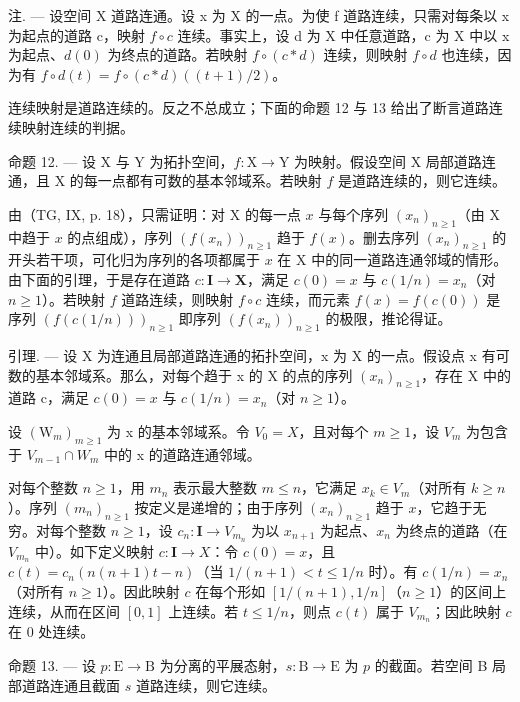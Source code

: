 注. --- 设空间 X 道路连通。设 x 为 X 的一点。为使 f 道路连续，只需对每条以 x 为起点的道路 c，映射 \(f \circ c\) 连续。事实上，设 d 为 X 中任意道路，c 为 X 中以 x 为起点、\(d(0)\) 为终点的道路。若映射 \(f \circ (c * d)\) 连续，则映射 \(f \circ d\) 也连续，因为有 \(f \circ d(t) = f \circ (c * d)((t + 1)/2)\)。

连续映射是道路连续的。反之不总成立；下面的命题 12 与 13 给出了断言道路连续映射连续的判据。

命题 12. --- 设 X 与 Y 为拓扑空间，\(f: \mathrm{X} \to \mathrm{Y}\) 为映射。假设空间 X 局部道路连通，且 X 的每一点都有可数的基本邻域系。若映射 \(f\) 是道路连续的，则它连续。

由（TG, IX, p. 18），只需证明：对 X 的每一点 \(x\) 与每个序列 \((x_n)_{n \geqslant 1}\)（由 X 中趋于 \(x\) 的点组成），序列 \((f(x_n))_{n \geqslant 1}\) 趋于 \(f(x)\)。删去序列 \((x_n)_{n \geqslant 1}\) 的开头若干项，可化归为序列的各项都属于 \(x\) 在 X 中的同一道路连通邻域的情形。由下面的引理，于是存在道路 \(c: \mathbf{I} \to \mathbf{X}\)，满足 \(c(0) = x\) 与 \(c(1/n) = x_n\)（对 \(n \geqslant 1\)）。若映射 \(f\) 道路连续，则映射 \(f \circ c\) 连续，而元素 \(f(x) = f(c(0))\) 是序列 \((f(c(1/n)))_{n \geqslant 1}\) 即序列 \((f(x_n))_{n \geqslant 1}\) 的极限，推论得证。

引理. --- 设 X 为连通且局部道路连通的拓扑空间，x 为 X 的一点。假设点 x 有可数的基本邻域系。那么，对每个趋于 x 的 X 的点的序列 \((x_{n})_{n\geqslant1}\)，存在 X 中的道路 c，满足 \(c(0)=x\) 与 \(c(1/n)=x_{n}\)（对 \(n\geqslant1\)）。

设 \((\mathrm{W}_{m})_{m\geqslant1}\) 为 x 的基本邻域系。令 \(V_{0}=X\)，且对每个 \(m\geqslant1\)，设 \(V_{m}\) 为包含于 \(V_{m-1}\cap W_{m}\) 中的 x 的道路连通邻域。

对每个整数 \(n \geqslant 1\)，用 \(m_n\) 表示最大整数 \(m \leqslant n\)，它满足 \(x_k \in V_m\)（对所有 \(k \geqslant n\)）。序列 \((m_n)_{n \geqslant 1}\) 按定义是递增的；由于序列 \((x_n)_{n \geqslant 1}\) 趋于 \(x\)，它趋于无穷。对每个整数 \(n \geqslant 1\)，设 \(c_n: \mathbf{I} \to V_{m_n}\) 为以 \(x_{n+1}\) 为起点、\(x_n\) 为终点的道路（在 \(V_{m_n}\) 中）。如下定义映射 \(c: \mathbf{I} \to X\)：令 \(c(0) = x\)，且 \(c(t) = c_n(n(n+1)t - n)\)（当 \(1/(n+1) < t \leqslant 1/n\) 时）。有 \(c(1/n) = x_n\)（对所有 \(n \geqslant 1\)）。因此映射 \(c\) 在每个形如 \([1/(n+1), 1/n]\)（\(n \geqslant 1\)）的区间上连续，从而在区间 \([0,1]\) 上连续。若 \(t \leqslant 1/n\)，则点 \(c(t)\) 属于 \(V_{m_n}\)；因此映射 \(c\) 在 0 处连续。

命题 13. --- 设 \(p \colon \mathrm{E} \to \mathrm{B}\) 为分离的平展态射，\(s \colon \mathrm{B} \to \mathrm{E}\) 为 \(p\) 的截面。若空间 B 局部道路连通且截面 \(s\) 道路连续，则它连续。

